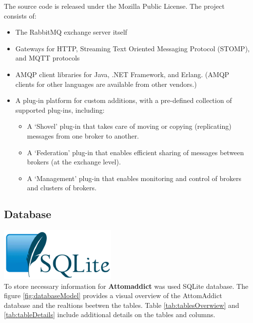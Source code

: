 \documentclass[12pt]{article}
\begin{document}
The source code is released under the Mozilla Public License. The project consists of:
\begin{itemize}
    
    \item The RabbitMQ exchange server itself

    \item Gateways for HTTP, Streaming Text Oriented Messaging Protocol (STOMP), and MQTT protocols

    \item  AMQP client libraries for Java, .NET Framework, and Erlang. (AMQP clients for other languages are available from other vendors.)

    \item A plug-in platform for custom additions, with a pre-defined collection of supported plug-ins, including:

        \begin{itemize}
        
            \item A `Shovel' plug-in that takes care of moving or copying (replicating) messages from one broker to another.

            \item A `Federation' plug-in that enables efficient sharing of messages between brokers (at the exchange level).

            \item A `Management' plug-in that enables monitoring and control of brokers and clusters of brokers.~\cite{wiki:rabbitmq}

        \end{itemize}
\end{itemize}

\subsection{Database}

\includegraphics{images/sqlite.png} \\

To store necessary information for \textbf{Attomaddict} was used SQLite database. The figure \ref{fig:databaseModel} provides a visual overview of the AttomAddict database and the realtions beetwen the tables. Table \ref{tab:tablesOverwiew} and \ref{tab:tableDetails} include additional details on the tables and columns.
\end{document}
